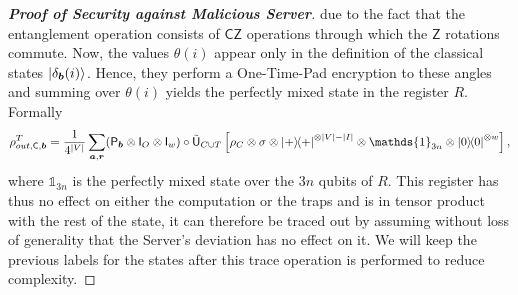 \documentclass[12pt]{iopart}
\newcommand{\cptp}[1]{\mathsf{#1}} \newcommand{\pd}[1]{\mathcal{#1}}  \newcommand{\sch}[1]{\bm{#1}}
\newcommand{\Id}{\cptp{I}}
\newcommand{\Z}{\cptp{Z}}
\renewcommand{\1}{\mathds{1}}
\newcommand{\CZ}{\mathsf{CZ}}
\newcommand{\TP}{C\cup T}
\begin{document}
\begin{proof}[\bf Proof of Security against Malicious Server]
due to the fact that the entanglement operation consists of $\CZ$ operations through which the $\Z$ rotations commute. Now, the values $\theta(i)$ appear only in the definition of the classical states $\ket{\delta_{\bm{b}}(i)}$. Hence, they perform a One-Time-Pad encryption to these angles and summing over $\theta(i)$ yields the perfectly mixed state in the register $R$. Formally
\begin{align}
\rho_{out, \cptp C, \bm{b}}^T = \frac{1}{4^{|V|}} \sum_{\bm{a}, \bm{r}} (\cptp P_{\bm{b}}\otimes\Id_O\otimes\Id_w)\circ \tilde{\cptp U}_{\TP} \left[\rho_C \otimes \sigma \otimes \dyad{+}^{\otimes |V| - |I|} \otimes \1_{3n} \otimes\dyad{0}^{\otimes w}\right],
\end{align}
where $\1_{3n}$ is the perfectly mixed state over the $3n$ qubits of $R$. This register has thus no effect on either the computation or the traps and is in tensor product with the rest of the state, it can therefore be traced out by assuming without loss of generality that the Server's deviation has no effect on it. We will keep the previous labels for the states after this trace operation is performed to reduce complexity.


\end{proof}
\end{document}
